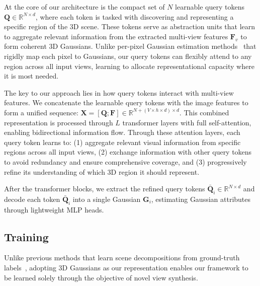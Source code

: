 At the core of our architecture is the compact set of $N$ learnable query tokens $\mathbf{Q} \in \mathbb{R}^{N \times d}$, where each token is tasked with discovering and representing a specific region of the 3D scene. These tokens serve as abstraction units that learn to aggregate relevant information from the extracted multi-view features $\mathbf{F}_v$ to form coherent 3D Gaussians. Unlike per-pixel Gaussian estimation methods~\cite{ye2024no, charatan2024pixelsplat} that rigidly map each pixel to Gaussians, our query tokens can flexibly attend to any region across all input views, learning to allocate representational capacity where it is most needed.


The key to our approach lies in how query tokens interact with multi-view features. We concatenate the learnable query tokens with the image features to form a unified sequence: \mbox{$\mathbf{X} = [\mathbf{Q}; \mathbf{F}] \in \mathbb{R}^{N + (V \times h \times d) \times d}$}. This combined representation is processed through $L$ transformer layers with full self-attention, enabling bidirectional information flow. Through these attention layers, each query token learns to: (1) aggregate relevant visual information from specific regions across all input views, (2) exchange information with other query tokens to avoid redundancy and ensure comprehensive coverage, and (3) progressively refine its understanding of which 3D region it should represent.

After the transformer blocks, we extract the refined query tokens \mbox{${\bar{\mathbf{Q}}_i} \in \mathbb{R}^{N \times d}$} and decode each token ${\bar{\mathbf{Q}}_i}$ into a single Gaussian $\mathbf{G}_i$, estimating Gaussian attributes through lightweight MLP heads.

\subsection{Training}
\label{subsec:training}
Unlike previous methods that learn scene decompositions from ground-truth labels~\cite{fedele2025superdec,paschalidou2019superquadrics}, adopting 3D Gaussians as our representation enables our framework to be learned solely through the objective of novel view synthesis.

